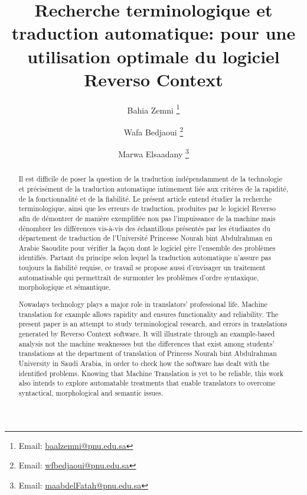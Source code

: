 \documentclass{textolivre}
\title{Recherche terminologique et traduction automatique: pour une utilisation optimale du logiciel Reverso Context}
\author[1]{Bahia Zemni \orcid{0000-0002-6238-7509} \thanks{Email: \url{baalzemni@pnu.edu.sa}}}
\author[1]{Wafa Bedjaoui \orcid{0000-0002-0660-8418} \thanks{Email: \url{wfbedjaoui@pnu.edu.sa}}}
\author[1]{Marwa Elsaadany \orcid{0000-0002-6867-4250} \thanks{Email: \url{maabdelFatah@pnu.edu.sa}}}
\affil[1]{Princess Nourah bint Abdulrahman University, Arabie Saoudite.}
\begin{document}
\maketitle

\begin{polyabstract}
\begin{french}
\begin{abstract}
Il est difficile de poser la question de la traduction indépendamment de la technologie et précisément de la traduction automatique intimement liée aux critères de la rapidité, de la fonctionnalité et de la fiabilité. Le présent article entend étudier la recherche terminologique, ainsi que les erreurs de traduction, produites par le logiciel Reverso afin de démontrer de manière exemplifiée non pas l’impuissance de la machine mais dénombrer les différences vis-à-vis des échantillons présentés par les étudiantes du département de traduction de l’Université Princesse Nourah bint Abdulrahman en Arabie Saoudite pour vérifier la façon dont le logiciel gère l’ensemble des problèmes identifiés. Partant du principe selon lequel la traduction automatique n’assure pas toujours la fiabilité requise, ce travail se propose aussi d’envisager un traitement automatisable qui permettrait de surmonter les problèmes d’ordre syntaxique, morphologique et sémantique.

\end{abstract}
\end{french}

\begin{english}
\begin{abstract}
Nowadays technology plays a major role in translators’ professional life. Machine translation for example allows rapidity and ensures functionality and reliability. The present paper is an attempt to study terminological research, and errors in translations generated by Reverso Context software. It will illustrate through an example-based analysis not the machine weaknesses but the differences that exist among students’ translations at the department of translation of Princess Nourah bint Abdulrahman University in Saudi Arabia, in order to check how the software has dealt with the identified problems. Knowing that Machine Translation is yet to be reliable, this work also intends to explore automatable treatments that enable translators to overcome syntactical, morphological and semantic issues.


\end{abstract}
\end{english}
\end{polyabstract}
\end{document}
